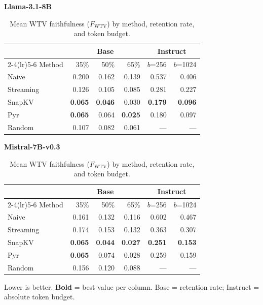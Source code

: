 \documentclass[10pt,letterpaper]{article}
\begin{document}
\begin{table}[H]
\centering
\small
\captionsetup{justification=centering}
\caption{Mean WTV faithfulness (\(F_{\text{WTV}}\)) by method, retention rate, and token budget.}
\label{tab:t3}
\begin{minipage}[t]{0.49\textwidth}
\centering
\textbf{Llama-3.1-8B}\\[0.4em]
\begin{tabular}{@{}lrrrrr@{}}
\toprule
& \multicolumn{3}{c}{Base} & \multicolumn{2}{c}{Instruct}\\
\cmidrule(lr){2-4}\cmidrule(lr){5-6}
Method & 35\% & 50\% & 65\% & $b$=256 & $b$=1024\\
\midrule
Naive      & 0.200 & 0.162 & 0.139 & 0.537 & 0.406\\
Streaming  & 0.126 & 0.105 & 0.085 & 0.281 & 0.227\\
SnapKV     & \textbf{0.065} & \textbf{0.046} & 0.030 & \textbf{0.179} & \textbf{0.096}\\
Pyr        & \textbf{0.065} & 0.064 & \textbf{0.025} & 0.180 & 0.097\\
Random     & 0.107 & 0.082 & 0.061 & --- & ---\\
\bottomrule
\end{tabular}
\end{minipage}%
\hfill
\begin{minipage}[t]{0.49\textwidth}
\centering
\textbf{Mistral-7B-v0.3}\\[0.4em]
\begin{tabular}{@{}lrrrrr@{}}
\toprule
& \multicolumn{3}{c}{Base} & \multicolumn{2}{c}{Instruct}\\
\cmidrule(lr){2-4}\cmidrule(lr){5-6}
Method & 35\% & 50\% & 65\% & $b$=256 & $b$=1024\\
\midrule
Naive      & 0.161 & 0.132 & 0.116 & 0.602 & 0.467\\
Streaming  & 0.174 & 0.153 & 0.132 & 0.363 & 0.307\\
SnapKV     & \textbf{0.065} & \textbf{0.044} & \textbf{0.027} & \textbf{0.251} & \textbf{0.153}\\
Pyr        & \textbf{0.065} & 0.074 & 0.028 & 0.259 & 0.159\\
Random     & 0.156 & 0.120 & 0.088 & --- & ---\\
\bottomrule
\end{tabular}
\end{minipage}
\par\smallskip
Lower is better. \textbf{Bold} = best value per column.
Base = retention rate; Instruct = absolute token budget.
\end{table}
\end{document}
